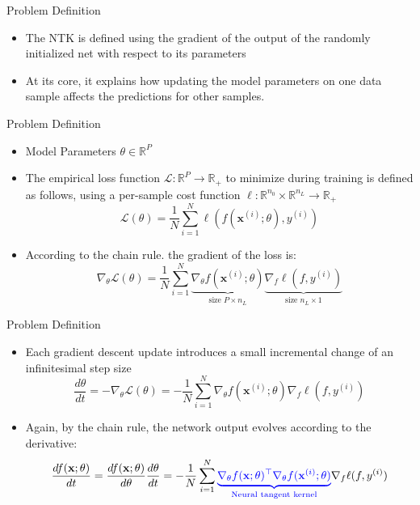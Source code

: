 \documentclass[serif, aspectratio=169]{beamer}
\begin{document}
\begin{frame}{Problem Definition}
	
	\begin{itemize}
		
		
		
		\item The NTK is defined using the gradient of the output of the randomly initialized net
		with respect to its parameters
		
		
		\item  At its core, it explains how updating the model parameters on one data sample affects the predictions for other samples.
	\end{itemize}
\end{frame}



\begin{frame}{Problem Definition}
	
	\begin{itemize}
		\item Model Parameters \(\theta \in \mathbb{R}^P\)
		
		\item The empirical loss function \(\mathcal{L}: \mathbb{R}^P \to \mathbb{R}_+\)
		to minimize during training is defined as follows, using a per-sample cost function \(\ell: \mathbb{R}^{n_0} \times \mathbb{R}^{n_L} \to \mathbb{R}_+\)
		\[
		\mathcal{L}(\theta) =\frac{1}{N} \sum_{i=1}^N \ell(f(\mathbf{x}^{(i)}; \theta), y^{(i)})
		\]
		\item  According to the chain rule. the gradient of the loss is:
		\[
		\nabla_\theta \mathcal{L}(\theta)= \frac{1}{N} \sum_{i=1}^N \underbrace{\nabla_\theta f(\mathbf{x}^{(i)}; \theta)}_{\text{size }P \times n_L} 
		\underbrace{\nabla_f \ell(f, y^{(i)})}_{\text{size } n_L \times 1}
		\]
		
	\end{itemize}
\end{frame}


\begin{frame}{Problem Definition}
	
	\begin{itemize}
		\item Each gradient descent update introduces a small incremental change of an infinitesimal step size
		\[
		\frac{d\theta}{d t} = - \nabla_\theta\mathcal{L}(\theta)  = -\frac{1}{N} \sum_{i=1}^N \nabla_\theta f(\mathbf{x}^{(i)}; \theta) \nabla_f \ell(f, y^{(i)})
		\] 
		\item Again, by the chain rule, the network output evolves according to the derivative:
		\[
		\frac{df(\mathbf{x};\theta)}{dt} 
		= \frac{df(\mathbf{x};\theta)}{d\theta}\frac{d\theta}{dt}
		= -\frac{1}{N} \sum_{i=1}^N \color{blue}{\underbrace{\nabla_\theta f(\mathbf{x};\theta)^\top \nabla_\theta f(\mathbf{x}^{(i)}; \theta)}_\text{Neural tangent kernel}} \color{black}{\nabla_f \ell(f, y^{(i)})}
		\]
		
	\end{itemize}
\end{frame}
\end{document}
